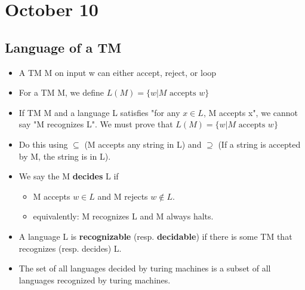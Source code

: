 \section{October 10}
\subsection{Language of a TM}
\begin{itemize}
  \item A TM M on input w can either accept, reject, or loop
  \item For a TM M, we define $L(M) = \{w | M \text{ accepts } w \}$
  \item If TM M and a language L satisfies "for any $x \in L$, M accepts x", we cannot say "M recognizes L". We must prove that $L(M) = \{w | M \text{ accepts } w \}$ 
  \item \quad Do this using $\subseteq$ (M accepts any string in L) and $\supseteq$ (If a string is accepted by M, the string is in L).
  \item We say the M \textbf{decides} L if 
  \begin{itemize}
    \item M accepts $w \in L$ and M rejects $w \notin L$.
    \item equivalently: M recognizes L and M always halts.
  \end{itemize}
  \item A language L is \textbf{recognizable} (resp. \textbf{decidable}) if there is some TM that recognizes (resp. decides) L.
  \item The set of all languages decided by turing machines is a subset of all languages recognized by turing machines.
\end{itemize}

